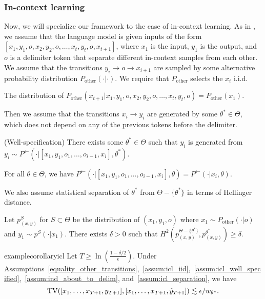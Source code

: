 \subsubsection{In-context learning} \label{subsec:icl}
Now, we will specialize our framework to the case of in-context learning. As in \cite{xie2022explanationincontextlearningimplicit}, we assume that the language model is given inputs of the form $[x_1,y_1,o,x_2,y_2,o,\dots,x_t,y_t,o,x_{t+1}]$, where $x_1$ is the input, $y_1$ is the output, and $o$ is a delimiter token that separate different in-context samples from each other. We assume that the transitions $y_i \to o \to x_{i+1}$ are sampled by some alternative probability distribution $P_{\textrm{other}}(\cdot | \cdot)$. We require that  $P_{\textrm{other}}$ selects the $x_i$ i.i.d.
\begin{assumption}\label{assum:icl_iid}
The distribution of $P_{\textrm{other}}(x_{t+1}| x_1,y_1,o,x_2,y_2,o,\dots,x_t,y_t,o)=P_{\textrm{other}}(x_1)$.
\end{assumption}
\noindent Then we assume that the transitions $x_i \to y_i$ are generated by some $\theta^* \in \Theta$, which does not depend on any of the previous tokens before the delimiter. 
\begin{assumption}\label{assum:icl_well_specified} (Well-specification)
There exists some $\theta^* \in \Theta$ such that $y_i$ is generated from $y_i\sim P^{\leftarrow}(\cdot |[x_1,y_1,o_1,\dots,o_{i-1},x_i],\theta^*)$.
\end{assumption}
\begin{assumption}\label{assum:ind_about_to_delim}
For all $\theta \in \Theta$,  we have $ P^{\leftarrow}(\cdot |[x_1,y_1,o_1,\dots,o_{i-1},x_i],\theta)= P^{\leftarrow}(\cdot |x_i,\theta)$.  
\end{assumption}
\noindent We also assume statistical separation of $\theta^*$ from $\Theta-\{\theta^*\}$ in terms of Hellinger distance. 
\begin{assumption}\label{assum:icl_separation}
Let $p_{(x,y)}^S$ for $S \subset \Theta$ be the distribution of $(x_1,y_1,o)$ where $x_1 \sim P_{\textrm{other}}(\cdot |o)$ and $y_1 \sim p^S(\cdot |x_1)$. There exists $\delta>0$ such that $H^2(p_{(x,y)}^{\Theta-\{\theta^*\}},p_{(x,y)}^{\theta^*}) \geq \delta.$
\end{assumption}
\begin{restatable}{example}{corollaryicl}\label{ex:app:corrollary_icl}
Let $T\geq \ln\left(\frac{1-\delta/2}{\epsilon}\right)$. Under Assumptions~\ref{equality_other_transitions},~\ref{assum:icl_iid},~\ref{assum:icl_well_specified},~\ref{assum:ind_about_to_delim}, and~\ref{assum:icl_separation}, we have \[\mathrm{TV}([x_1,\dots,x_{T+1},y_{T+1}],[x_1,\dots,x_{T+1},\tilde{y}_{T+1}])\lesssim \epsilon/w_{\theta^*}.\]
\end{restatable}
